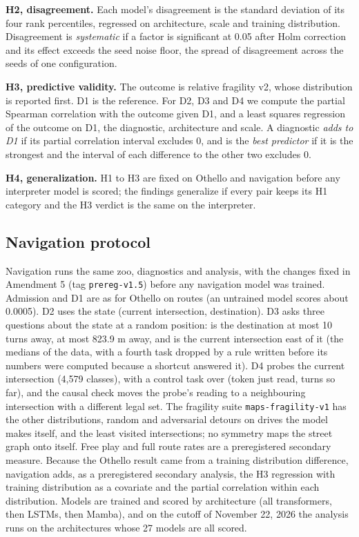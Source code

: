\documentclass[journal]{IEEEtran}
\begin{document}
\textbf{H2, disagreement.} Each model's disagreement is the standard deviation of its four rank percentiles,
regressed on architecture, scale and training distribution. Disagreement is \emph{systematic} if a factor is
significant at 0.05 after Holm correction and its effect exceeds the seed noise floor, the spread of disagreement
across the seeds of one configuration.

\textbf{H3, predictive validity.} The outcome is relative fragility v2, whose distribution is reported first. D1 is
the reference. For D2, D3 and D4 we compute the partial Spearman correlation with the outcome given D1, and a least
squares regression of the outcome on D1, the diagnostic, architecture and scale. A diagnostic \emph{adds to D1} if
its partial correlation interval excludes 0, and is the \emph{best predictor} if it is the strongest and the
interval of each difference to the other two excludes 0.

\textbf{H4, generalization.} H1 to H3 are fixed on Othello and navigation before any interpreter model is scored;
the findings generalize if every pair keeps its H1 category and the H3 verdict is the same on the interpreter.

\subsection{Navigation protocol}
\label{sec:navmethod}
Navigation runs the same zoo, diagnostics and analysis, with the changes fixed in Amendment 5 (tag
\texttt{prereg-v1.5}) before any navigation model was trained. Admission and D1 are as for Othello on routes (an
untrained model scores about 0.0005). D2 uses the state (current intersection, destination). D3 asks three questions
about the state at a random position: is the destination at most 10 turns away, at most 823.9 m away, and is the
current intersection east of it (the medians of the data, with a fourth task dropped by a rule written before its
numbers were computed because a shortcut answered it). D4 probes the current intersection (4,579 classes), with a
control task over (token just read, turns so far), and the causal check moves the probe's reading to a neighbouring
intersection with a different legal set. The fragility suite \texttt{maps-fragility-v1} has the other distributions,
random and adversarial detours on drives the model makes itself, and the least visited intersections; no symmetry
maps the street graph onto itself. Free play and full route rates are a preregistered secondary measure. Because the
Othello result came from a training distribution difference, navigation adds, as a preregistered secondary analysis,
the H3 regression with training distribution as a covariate and the partial correlation within each distribution.
Models are trained and scored by architecture (all transformers, then LSTMs, then Mamba), and on the cutoff of
November 22, 2026 the analysis runs on the architectures whose 27 models are all scored.
\end{document}
